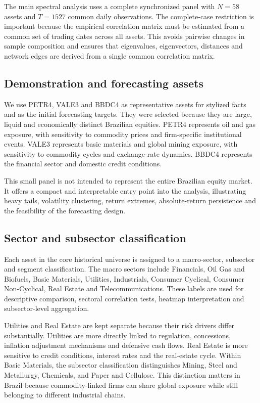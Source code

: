 The main spectral analysis uses a complete synchronized panel with $N=58$ assets and $T=1527$ common daily observations. The complete-case restriction is important because the empirical correlation matrix must be estimated from a common set of trading dates across all assets. This avoids pairwise changes in sample composition and ensures that eigenvalues, eigenvectors, distances and network edges are derived from a single common correlation matrix.

\subsection{Demonstration and forecasting assets}

We use PETR4, VALE3 and BBDC4 as representative assets for stylized facts and as the initial forecasting targets. They were selected because they are large, liquid and economically distinct Brazilian equities. PETR4 represents oil and gas exposure, with sensitivity to commodity prices and firm-specific institutional events. VALE3 represents basic materials and global mining exposure, with sensitivity to commodity cycles and exchange-rate dynamics. BBDC4 represents the financial sector and domestic credit conditions.

This small panel is not intended to represent the entire Brazilian equity market. It offers a compact and interpretable entry point into the analysis, illustrating heavy tails, volatility clustering, return extremes, absolute-return persistence and the feasibility of the forecasting design.

\subsection{Sector and subsector classification}

Each asset in the core historical universe is assigned to a macro-sector, subsector and segment classification. The macro sectors include Financials, Oil Gas and Biofuels, Basic Materials, Utilities, Industrials, Consumer Cyclical, Consumer Non-Cyclical, Real Estate and Telecommunications. These labels are used for descriptive comparison, sectoral correlation tests, heatmap interpretation and subsector-level aggregation.

Utilities and Real Estate are kept separate because their risk drivers differ substantially. Utilities are more directly linked to regulation, concessions, inflation adjustment mechanisms and defensive cash flows. Real Estate is more sensitive to credit conditions, interest rates and the real-estate cycle. Within Basic Materials, the subsector classification distinguishes Mining, Steel and Metallurgy, Chemicals, and Paper and Cellulose. This distinction matters in Brazil because commodity-linked firms can share global exposure while still belonging to different industrial chains.

